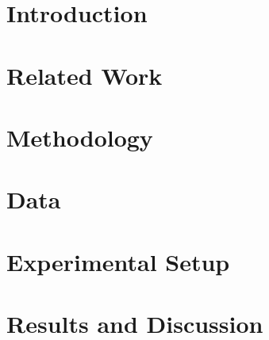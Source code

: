 \documentclass[]{ceurart}
\begin{document}
\maketitle

\section{Introduction}
\label{sec:intro}


\section{Related Work}
\label{sec:related}


\section{Methodology}
\label{sec:method}


\section{Data}
\label{sec:data}


\section{Experimental Setup}
\label{sec:experiments}


\section{Results and Discussion}
\label{sec:results}

\end{document}
